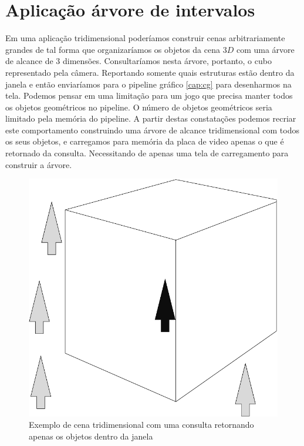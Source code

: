\section{Aplicação árvore de intervalos}\label{cap:application-points}
Em uma aplicação tridimensional poderíamos construir cenas arbitrariamente grandes de tal forma que organizaríamos os objetos da cena $3D$ com uma árvore de alcance de 3 dimensões. Consultaríamos nesta árvore, portanto, o cubo representado pela câmera. Reportando somente quais estruturas estão dentro da janela e então enviaríamos para o pipeline gráfico \ref{cap:cg} para desenharmos na tela. Podemos pensar em uma limitação para um jogo que precisa manter todos os objetos geométricos no pipeline. O número de objetos geométricos seria limitado pela memória do pipeline. 
A partir destas constatações podemos recriar este comportamento construindo uma árvore de alcance tridimensional com todos os seus objetos, e carregamos para memória da placa de video apenas o que é retornado da consulta. Necessitando de apenas uma tela de carregamento para construir a árvore.

\begin{figure}[h!]
    \centering
    \includegraphics[scale=0.4]{images/3d-query-example.pdf}
    \caption{Exemplo de cena tridimensional com uma consulta retornando apenas os objetos dentro da janela}
    \label{fig:3d-query-example}
\end{figure}

